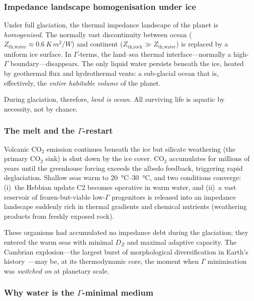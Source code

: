 \documentclass[aps,pre,twocolumn,superscriptaddress,floatfix]{revtex4-2}
\begin{document}
\subsubsection{Impedance landscape homogenisation under ice}

Under full glaciation, the thermal impedance landscape of
the planet is \emph{homogenised}.
The normally vast discontinuity between ocean
($Z_{\text{th,water}} \approx \SI{0.6}{K\,m^2/W}$) and
continent ($Z_{\text{th,rock}} \gg Z_{\text{th,water}}$)
is replaced by a uniform ice surface.
In $\Gamma$-terms, the land--sea thermal interface---normally
a high-$\Gamma$ boundary---disappears.
The only liquid water persists beneath the ice, heated by
geothermal flux and hydrothermal vents: a sub-glacial ocean
that is, effectively, the \emph{entire habitable volume} of
the planet.

During glaciation, therefore, \emph{land is ocean}.
All surviving life is aquatic by necessity, not by chance.

\subsubsection{The melt and the $\Gamma$-restart}

Volcanic CO$_2$ emission continues beneath the ice but
silicate weathering (the primary CO$_2$ sink) is shut down
by the ice cover.  CO$_2$ accumulates for millions of years
until the greenhouse forcing exceeds the albedo feedback,
triggering rapid deglaciation.
Shallow seas warm to \SIrange{20}{30}{\celsius}, and two
conditions converge:
(i)~the Hebbian update C2 becomes operative in warm water,
and (ii)~a vast reservoir of frozen-but-viable
low-$\Gamma$ progenitors is released into an
impedance landscape suddenly rich in thermal gradients and
chemical nutrients (weathering products from freshly
exposed rock).

These organisms had accumulated no impedance debt during
the glaciation; they entered the warm seas with minimal
$D_Z$ and maximal adaptive capacity.
The Cambrian explosion---the largest burst of morphological
diversification in Earth's history~\cite{Erwin2011}---may
be, at its thermodynamic core, the moment when $\Gamma$
minimisation was \emph{switched on} at planetary scale.

\subsubsection{Why water is the $\Gamma$-minimal medium}
\end{document}
